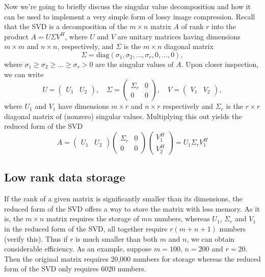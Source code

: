 

Now we're going to briefly discuss the singular value decomposition and how it can be used to implement a very simple form of lossy image compression. Recall that the SVD is a decomposition of the $m\times n$ matrix $A$
of rank $r$ into the product $A = U \Sigma V^H$, where $U$ and $V$
are unitary matrices having dimensions $m\times m$ and $n\times n$,
respectively, and $\Sigma$ is the $m\times n$ diagonal matrix
\[
\Sigma = \mbox{diag}(\sigma_1,\sigma_2,\ldots,\sigma_r,0,\ldots,0),
\]
where $\sigma_1 \geq \sigma_2 \geq \ldots \geq \sigma_r > 0$ are the
singular values of $A$.  Upon closer inspection, we can write
\[
U = \begin{pmatrix}U_1 & U_2\end{pmatrix}, \quad \Sigma =
\begin{pmatrix}\Sigma_r & 0\\0 & 0\end{pmatrix}, \quad V =
\begin{pmatrix}V_1 & V_2\end{pmatrix},
\]
where $U_1$ and $V_1$ have dimensions $m\times r$ and $n\times r$
respectively and $\Sigma_r$ is the $r\times r$ diagonal matrix of
(nonzero) singular values.  Multiplying this out yields the reduced
form of the SVD
\[
A =
\begin{pmatrix}U_1 & U_2\end{pmatrix}
\begin{pmatrix}\Sigma_r & 0\\0 & 0\end{pmatrix}
\begin{pmatrix}V^H_1 \\ V^H_2\end{pmatrix} =
U_1 \Sigma_r V_1^H
\]
\subsection{Low rank data storage}

If the rank of a given matrix is significantly smaller than its
dimensions, the reduced form of the SVD offers a way to store the
matrix with less memory.  As it is, the $m\times n$ matrix requires
the storage of $mn$ numbers, whereas $U_1$, $\Sigma_r$ and $V_1$ in
the reduced form of the SVD, all together require $r(m+n+1)$ numbers
(verify this).  Thus if $r$ is much smaller than both $m$ and $n$,
we can obtain considerable efficiency.  As an example, suppose
$m=100$, $n=200$ and $r=20$. Then the original matrix requires
20,000 numbers for storage whereas the reduced form of the SVD only
requires 6020 numbers.


